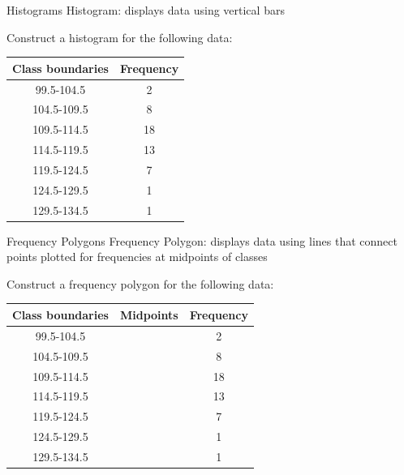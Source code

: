 \documentclass[t, aspectratio=169]{beamer}
\newcommand{\?}{\stackrel{?}{=}}
\begin{document}
	\begin{frame}{Histograms}
		Histogram: displays data using vertical bars \pause
		
		Construct a histogram for the following data:
		
		\begin{tabular}{|c|c|} \hline
			Class boundaries & Frequency \\ \hline
			99.5-104.5 & 2 \\
			104.5-109.5 & 8 \\
			109.5-114.5 & 18 \\
			114.5-119.5 & 13 \\
			119.5-124.5 & 7 \\
			124.5-129.5 & 1 \\
			129.5-134.5 & 1 \\ \hline
		\end{tabular}
	\end{frame}

	\begin{frame}{Frequency Polygons}
		Frequency Polygon: displays data using lines that connect points plotted for frequencies at midpoints of classes \pause
		
		Construct a frequency polygon for the following data:
		
		\begin{tabular}{|c|c|c|} \hline
			Class boundaries & Midpoints & Frequency \\ \hline
			99.5-104.5 &  & 2 \\
			104.5-109.5 &  & 8 \\
			109.5-114.5 &  & 18 \\
			114.5-119.5 &  & 13 \\
			119.5-124.5 &  & 7 \\
			124.5-129.5 &  & 1 \\
			129.5-134.5 &  & 1 \\ \hline
		\end{tabular}
	\end{frame}
\end{document}

